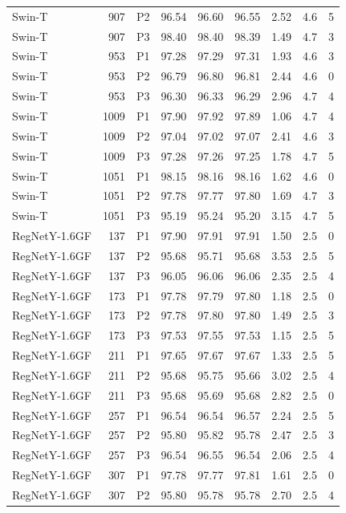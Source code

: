 {\begin{longtable}{lrlrrrrrr}
Swin-T & 907 & P2 & 96.54 & 96.60 & 96.55 & 2.52 & 4.6 & 5 \\
Swin-T & 907 & P3 & 98.40 & 98.40 & 98.39 & 1.49 & 4.7 & 3 \\
Swin-T & 953 & P1 & 97.28 & 97.29 & 97.31 & 1.93 & 4.6 & 3 \\
Swin-T & 953 & P2 & 96.79 & 96.80 & 96.81 & 2.44 & 4.6 & 0 \\
Swin-T & 953 & P3 & 96.30 & 96.33 & 96.29 & 2.96 & 4.7 & 4 \\
Swin-T & 1009 & P1 & 97.90 & 97.92 & 97.89 & 1.06 & 4.7 & 4 \\
Swin-T & 1009 & P2 & 97.04 & 97.02 & 97.07 & 2.41 & 4.6 & 3 \\
Swin-T & 1009 & P3 & 97.28 & 97.26 & 97.25 & 1.78 & 4.7 & 5 \\
Swin-T & 1051 & P1 & 98.15 & 98.16 & 98.16 & 1.62 & 4.6 & 0 \\
Swin-T & 1051 & P2 & 97.78 & 97.77 & 97.80 & 1.69 & 4.7 & 3 \\
Swin-T & 1051 & P3 & 95.19 & 95.24 & 95.20 & 3.15 & 4.7 & 5 \\
RegNetY-1.6GF & 137 & P1 & 97.90 & 97.91 & 97.91 & 1.50 & 2.5 & 0 \\
RegNetY-1.6GF & 137 & P2 & 95.68 & 95.71 & 95.68 & 3.53 & 2.5 & 5 \\
RegNetY-1.6GF & 137 & P3 & 96.05 & 96.06 & 96.06 & 2.35 & 2.5 & 4 \\
RegNetY-1.6GF & 173 & P1 & 97.78 & 97.79 & 97.80 & 1.18 & 2.5 & 0 \\
RegNetY-1.6GF & 173 & P2 & 97.78 & 97.80 & 97.80 & 1.49 & 2.5 & 3 \\
RegNetY-1.6GF & 173 & P3 & 97.53 & 97.55 & 97.53 & 1.15 & 2.5 & 5 \\
RegNetY-1.6GF & 211 & P1 & 97.65 & 97.67 & 97.67 & 1.33 & 2.5 & 5 \\
RegNetY-1.6GF & 211 & P2 & 95.68 & 95.75 & 95.66 & 3.02 & 2.5 & 4 \\
RegNetY-1.6GF & 211 & P3 & 95.68 & 95.69 & 95.68 & 2.82 & 2.5 & 0 \\
RegNetY-1.6GF & 257 & P1 & 96.54 & 96.54 & 96.57 & 2.24 & 2.5 & 5 \\
RegNetY-1.6GF & 257 & P2 & 95.80 & 95.82 & 95.78 & 2.47 & 2.5 & 3 \\
RegNetY-1.6GF & 257 & P3 & 96.54 & 96.55 & 96.54 & 2.06 & 2.5 & 4 \\
RegNetY-1.6GF & 307 & P1 & 97.78 & 97.77 & 97.81 & 1.61 & 2.5 & 0 \\
RegNetY-1.6GF & 307 & P2 & 95.80 & 95.78 & 95.78 & 2.70 & 2.5 & 4 \\

\end{longtable}}
